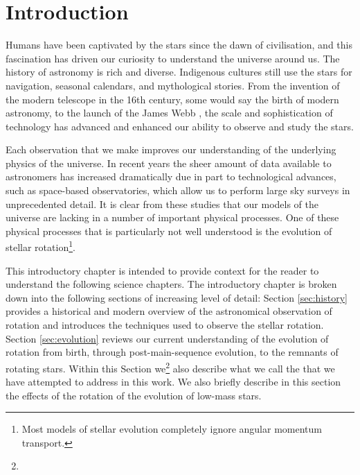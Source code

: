 
\newcommand\dive{\textmd{div}}
\newcommand\der{\textmd{d}}
\newcommand\rper{$R_{\rm{per}}$}

\chapter{Introduction}
\label{chap:intro}

Humans have been captivated by the stars since the dawn of civilisation, and this fascination has driven our curiosity to understand the universe around us. 
The history of astronomy is rich and diverse. 
Indigenous cultures still use the stars for navigation, seasonal calendars, and mythological stories. 
From the invention of the modern telescope in the 16th century, some would say the birth of modern astronomy, to the launch of the James Webb , the scale and sophistication of technology has advanced and enhanced our ability to observe and study the stars. 

Each observation that we make improves our understanding of the underlying physics of the universe. 
In recent years the sheer amount of data available to astronomers has increased dramatically due in part to technological advances, such as space-based observatories, which allow us to perform large sky surveys in unprecedented detail. 
It is clear from these studies that our models of the universe are lacking in a number of important physical processes. 
One of these physical processes that is particularly not well understood is the evolution of stellar rotation\footnote{Most models of stellar evolution completely ignore angular momentum transport.}.

This introductory chapter is intended to provide context for the reader to understand the following science chapters. 
The introductory chapter is broken down into the following sections of increasing level of detail:
Section \ref{sec:history} provides a historical and modern overview of the astronomical observation of rotation and introduces the techniques used to observe the stellar rotation.
Section \ref{sec:evolution} reviews our current understanding of the evolution of rotation from birth, through post-main-sequence evolution, to the remnants of rotating stars. Within this Section we\footnote{} also describe what we call the  that we have attempted to address in this work. We also briefly describe in this section the effects of the rotation of the evolution of low-mass stars.

